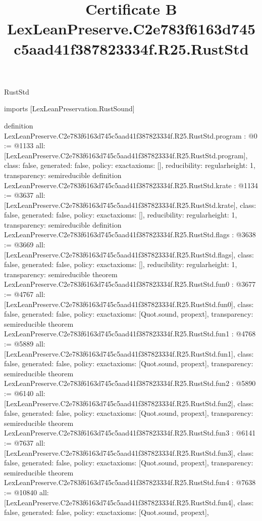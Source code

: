 \begin{lexlean}{RustStd}
\title{Certificate B LexLeanPreserve.C2e783f6163d745c5aad41f387823334f.R25.RustStd}
\begin{coremodule}
imports [LexLeanPreservation.RustSound]

definition LexLeanPreserve.C2e783f6163d745c5aad41f387823334f.R25.RustStd.program : @0 := @1133 {
  all: [LexLeanPreserve.C2e783f6163d745c5aad41f387823334f.R25.RustStd.program],
  class: false,
  generated: false,
  policy: exact{axioms: []},
  reducibility: regular{height: 1},
  transparency: semireducible
}
definition LexLeanPreserve.C2e783f6163d745c5aad41f387823334f.R25.RustStd.krate : @1134 := @3637 {
  all: [LexLeanPreserve.C2e783f6163d745c5aad41f387823334f.R25.RustStd.krate],
  class: false,
  generated: false,
  policy: exact{axioms: []},
  reducibility: regular{height: 1},
  transparency: semireducible
}
definition LexLeanPreserve.C2e783f6163d745c5aad41f387823334f.R25.RustStd.flags : @3638 := @3669 {
  all: [LexLeanPreserve.C2e783f6163d745c5aad41f387823334f.R25.RustStd.flags],
  class: false,
  generated: false,
  policy: exact{axioms: []},
  reducibility: regular{height: 1},
  transparency: semireducible
}
theorem LexLeanPreserve.C2e783f6163d745c5aad41f387823334f.R25.RustStd.fun0 : @3677 := @4767 {
  all: [LexLeanPreserve.C2e783f6163d745c5aad41f387823334f.R25.RustStd.fun0],
  class: false,
  generated: false,
  policy: exact{axioms: [Quot.sound, propext]},
  transparency: semireducible
}
theorem LexLeanPreserve.C2e783f6163d745c5aad41f387823334f.R25.RustStd.fun1 : @4768 := @5889 {
  all: [LexLeanPreserve.C2e783f6163d745c5aad41f387823334f.R25.RustStd.fun1],
  class: false,
  generated: false,
  policy: exact{axioms: [Quot.sound, propext]},
  transparency: semireducible
}
theorem LexLeanPreserve.C2e783f6163d745c5aad41f387823334f.R25.RustStd.fun2 : @5890 := @6140 {
  all: [LexLeanPreserve.C2e783f6163d745c5aad41f387823334f.R25.RustStd.fun2],
  class: false,
  generated: false,
  policy: exact{axioms: [Quot.sound, propext]},
  transparency: semireducible
}
theorem LexLeanPreserve.C2e783f6163d745c5aad41f387823334f.R25.RustStd.fun3 : @6141 := @7637 {
  all: [LexLeanPreserve.C2e783f6163d745c5aad41f387823334f.R25.RustStd.fun3],
  class: false,
  generated: false,
  policy: exact{axioms: [Quot.sound, propext]},
  transparency: semireducible
}
theorem LexLeanPreserve.C2e783f6163d745c5aad41f387823334f.R25.RustStd.fun4 : @7638 := @10840 {
  all: [LexLeanPreserve.C2e783f6163d745c5aad41f387823334f.R25.RustStd.fun4],
  class: false,
  generated: false,
  policy: exact{axioms: [Quot.sound, propext]},
}
\end{coremodule}
\end{lexlean}
